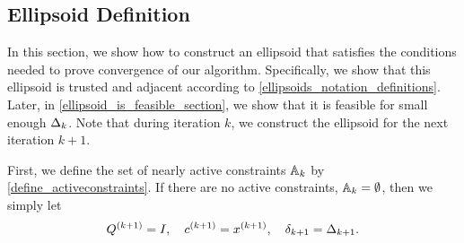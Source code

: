 \subsection{Ellipsoid Definition}
\label{conservative_ellipsoid_construction}

In this section,  we show how to construct an ellipsoid that satisfies the conditions needed to prove convergence of our algorithm.  Specifically, we show that this ellipsoid is
trusted and adjacent
according to \cref{ellipsoids_notation_definitions}.
Later, in \cref{ellipsoid_is_feasible_section}, we show that it is feasible for small enough $\Delta_k$.
Note that during iteration $k$, we construct the ellipsoid for the next iteration $k+1$.



First, we define the set of nearly active constraints ${\mathbb A_{k}}$ by \cref{define_activeconstraints}.
If there are no active constraints, ${\mathbb A_{k}} = \emptyset$, then we simply let
\begin{align}
{Q^{(k+1)}} = I, \quad {c^{(k+1)}} = {{x}^{(k+1)}}, \quad {\delta_{k+1}} = \Delta_{k+1}. \label{define_trivial_ellipsek}
\end{align}

